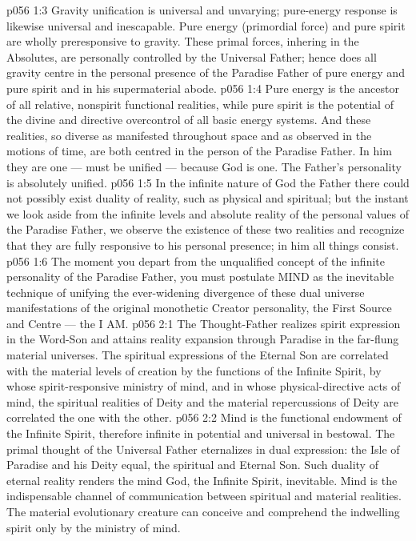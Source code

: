\vs p056 1:3 Gravity unification is universal and unvarying; pure\hyp{}energy response is likewise universal and inescapable. Pure energy (primordial force) and pure spirit are wholly preresponsive to gravity. These primal forces, inhering in the Absolutes, are personally controlled by the Universal Father; hence does all gravity centre in the personal presence of the Paradise Father of pure energy and pure spirit and in his supermaterial abode.
\vs p056 1:4 \pc Pure energy is the ancestor of all relative, nonspirit functional realities, while pure spirit is the potential of the divine and directive overcontrol of all basic energy systems. And these realities, so diverse as manifested throughout space and as observed in the motions of time, are both centred in the person of the Paradise Father. In him they are one --- must be unified --- because God is one. The Father’s personality is absolutely unified.
\vs p056 1:5 In the infinite nature of God the Father there could not possibly exist duality of reality, such as physical and spiritual; but the instant we look aside from the infinite levels and absolute reality of the personal values of the Paradise Father, we observe the existence of these two realities and recognize that they are fully responsive to his personal presence; in him all things consist.
\vs p056 1:6 The moment you depart from the unqualified concept of the infinite personality of the Paradise Father, you must postulate MIND as the inevitable technique of unifying the ever\hyp{}widening divergence of these dual universe manifestations of the original monothetic Creator personality, the First Source and Centre --- the I AM.
\vs p056 2:1 The Thought\hyp{}Father realizes spirit expression in the Word\hyp{}Son and attains reality expansion through Paradise in the far\hyp{}flung material universes. The spiritual expressions of the Eternal Son are correlated with the material levels of creation by the functions of the Infinite Spirit, by whose spirit\hyp{}responsive ministry of mind, and in whose physical\hyp{}directive acts of mind, the spiritual realities of Deity and the material repercussions of Deity are correlated the one with the other.
\vs p056 2:2 Mind is the functional endowment of the Infinite Spirit, therefore infinite in potential and universal in bestowal. The primal thought of the Universal Father eternalizes in dual expression: the Isle of Paradise and his Deity equal, the spiritual and Eternal Son. Such duality of eternal reality renders the mind God, the Infinite Spirit, inevitable. Mind is the indispensable channel of communication between spiritual and material realities. The material evolutionary creature can conceive and comprehend the indwelling spirit only by the ministry of mind.
